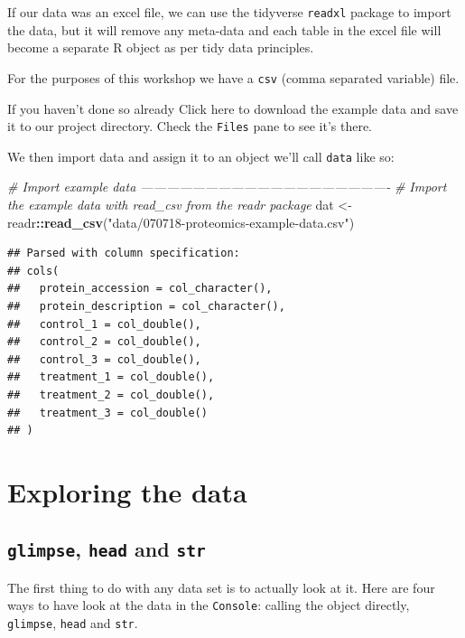 \documentclass[12pt,]{book}
\newenvironment{Shaded}{\begin{snugshade}}{\end{snugshade}}
\newcommand{\KeywordTok}[1]{\textcolor[rgb]{0.13,0.29,0.53}{\textbf{#1}}}
\newcommand{\StringTok}[1]{\textcolor[rgb]{0.31,0.60,0.02}{#1}}
\newcommand{\CommentTok}[1]{\textcolor[rgb]{0.56,0.35,0.01}{\textit{#1}}}
\newcommand{\OperatorTok}[1]{\textcolor[rgb]{0.81,0.36,0.00}{\textbf{#1}}}
\newcommand{\NormalTok}[1]{#1}
\theoremstyle{definition}
\theoremstyle{definition}
\theoremstyle{definition}
\theoremstyle{remark}
\begin{document}
If our data was an excel file, we can use the tidyverse \texttt{readxl}
package to import the data, but it will remove any meta-data and each
table in the excel file will become a separate R object as per tidy data
principles.

For the purposes of this workshop we have a \texttt{csv} (comma
separated variable) file.

If you haven't done so already Click here to download the example data
and save it to our project directory. Check the \texttt{Files} pane to
see it's there.

We then import data and assign it to an object we'll call \texttt{data}
like so:

\begin{Shaded}
\begin{Highlighting}[]
\CommentTok{# Import example data ----------------------------------------------------------}
\CommentTok{# Import the example data with read_csv from the readr package}
\NormalTok{dat <-}\StringTok{ }\NormalTok{readr}\OperatorTok{::}\KeywordTok{read_csv}\NormalTok{(}\StringTok{"data/070718-proteomics-example-data.csv"}\NormalTok{)}
\end{Highlighting}
\end{Shaded}

\begin{verbatim}
## Parsed with column specification:
## cols(
##   protein_accession = col_character(),
##   protein_description = col_character(),
##   control_1 = col_double(),
##   control_2 = col_double(),
##   control_3 = col_double(),
##   treatment_1 = col_double(),
##   treatment_2 = col_double(),
##   treatment_3 = col_double()
## )
\end{verbatim}

\section{Exploring the data}\label{exploring-the-data}

\subsection{\texorpdfstring{\texttt{glimpse}, \texttt{head} and
\texttt{str}}{glimpse, head and str}}\label{glimpse-head-and-str}

The first thing to do with any data set is to actually look at it. Here
are four ways to have look at the data in the \texttt{Console}: calling
the object directly, \texttt{glimpse}, \texttt{head} and \texttt{str}.
\end{document}
